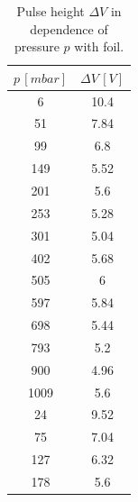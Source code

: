 \begin{table}[H]
	\centering
	\caption{Pulse height $\Delta V$ in dependence of pressure $p$ with foil.}
	\label{tab:stopping_wf}
	\begin{tabular}{c | c}
		\toprule
		$p \, [mbar]$ & $\Delta V \, [V]$\\
		\midrule
		6 & 10.4 \\
		 51 & 7.84 \\
		 99 & 6.8 \\
		 149 & 5.52 \\
		 201 & 5.6 \\
		 253 & 5.28 \\
		 301 & 5.04 \\
		 402 & 5.68 \\
		 505 & 6 \\
		 597 & 5.84 \\
		 698 & 5.44 \\
		 793 & 5.2 \\
		 900 & 4.96 \\
		 1009 & 5.6 \\
		 24 & 9.52 \\
		 75 & 7.04 \\
		 127 & 6.32 \\
		 178 & 5.6 \\
		 \bottomrule
	\end{tabular}
\end{table}
